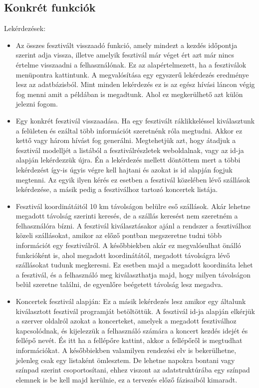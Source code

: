 \subsection{Konkrét funkciók}

Lekérdezések:
\begin{itemize}
\item Az összes fesztivált visszaadó funkció, amely mindezt a kezdés időpontja szerint adja vissza, illetve amelyik fesztivál már véget ért azt már nincs értelme visszaadni a felhasználónak. Ez az alapértelmezett, ha a fesztiválok menüpontra kattintunk. A megvalósítása egy egyszerű lekérdezés eredménye lesz az adatbázisból. Mint minden lekérdezés ez is az egész hívási láncon végig fog menni amit a példában is megadtunk. Ahol ez megkerülhető azt külön jelezni fogom.
 
\item Egy konkrét fesztivál visszaadása. Ha egy fesztivált ráklikkeléssel kiválasztunk a felületen és ezáltal több információt szeretnénk róla megtudni. Akkor ez kettő vagy három hívást fog generálni. Megtehetjük azt, hogy átadjuk a fesztivál modelljét a listából a fesztiválrészletek weboldalnak, vagy az id-ja alapján lekérdezzük újra. Én a lekérdezés mellett döntöttem mert a többi lekérdezést így-is úgyis végre kell hajtani és azokat is id alapján fogjuk megtenni. Az egyik ilyen kérés ez esetben a fesztivál közelében lévő szállások lekérdezése, a másik pedig a fesztiválhoz tartozó koncertek listája.   

\item Fesztivál koordinátáitól 10 km távolságon belülre eső szállások. Akár lehetne megadott távolság szerinti keresés, de a szállás keresést nem szeretném a felhasználóra bízni. A fesztivál kiválasztásakor ajánl a rendszer a fesztiválhoz közeli szállásokat, amikor az előző pontban megszeretne tudni több információt egy fesztiválról. A későbbiekben akár ez megvalósulhat önálló funkcióként is, ahol megadott koordinátától, megadott távolságra lévő szállásokat tudunk megkeresni. Ez esetben majd a megadott koordináta lehet a fesztivál, és a felhasználó meg kiválaszthatja majd, hogy milyen távolságon belül szeretne találni, de egyenlőre beégetett távolság lesz megadva.

\item Koncertek fesztivál alapján: Ez a másik lekérdezés lesz amikor egy általunk kiválasztott fesztivál programját betöltöttük. A fesztivál id-ja alapján elkérjük a szerver oldalról azokat a koncerteket, amelyek a megadott fesztiválhoz kapcsolódnak, és kijelezzük a felhasználó számára a koncert kezdés idejét és fellépő nevét. És itt ha a fellépőre kattint, akkor a fellépőről is megtudhat információkat. A későbbiekben valamilyen rendezési elv is bekerülhetne, jelenleg csak egy listaként ömlesztem. De lehetne napokra bontani vagy színpad szerint csoportosítani, ehhez viszont az adatstruktúrába egy színpad elemnek is be kell majd kerülnie, ez a tervezés előző fázisaiból kimaradt.


\end{itemize}
